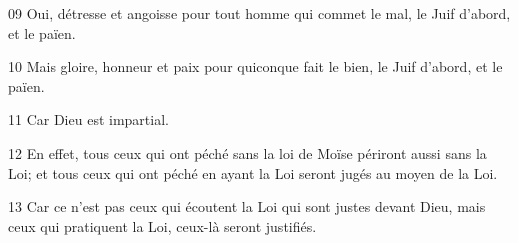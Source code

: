 
09 Oui, détresse et angoisse pour tout homme qui commet le mal, le Juif d’abord, et le païen.

10 Mais gloire, honneur et paix pour quiconque fait le bien, le Juif d’abord, et le païen.

11 Car Dieu est impartial.

12 En effet, tous ceux qui ont péché sans la loi de Moïse périront aussi sans la Loi; et tous ceux qui ont péché en ayant la Loi seront jugés au moyen de la Loi.

13 Car ce n’est pas ceux qui écoutent la Loi qui sont justes devant Dieu, mais ceux qui pratiquent la Loi, ceux-là seront justifiés.